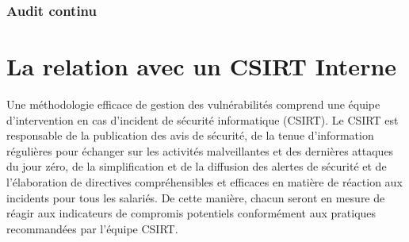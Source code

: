\subsubsection{Audit continu}




\section{La relation avec un CSIRT Interne }

	Une méthodologie efficace de gestion des vulnérabilités comprend une équipe d’intervention en cas d’incident de sécurité informatique (CSIRT). Le CSIRT est responsable de la publication des avis de sécurité, de la tenue d'information régulières pour échanger sur les activités malveillantes et des dernières attaques du jour zéro, de la simplification et de la diffusion des alertes de sécurité et de l’élaboration de directives compréhensibles et efficaces en matière de réaction aux incidents pour tous les salariés. De cette manière, chacun seront en mesure de réagir aux indicateurs de compromis potentiels conformément aux pratiques recommandées par l'équipe CSIRT.




